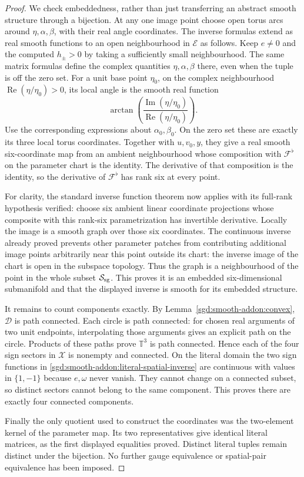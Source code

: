 \begin{proof}
We check embeddedness, rather than just transferring an abstract
smooth structure through a bijection.
At any one image point choose open torus arcs around
$\eta,\alpha,\beta$, with their real angle coordinates.
The inverse formulas extend as real smooth functions to an open
neighbourhood in $\mathcal E$ as follows. Keep $e\ne0$ and the
computed $h_\pm>0$ by taking a sufficiently small neighbourhood.
The same matrix formulas define the complex quantities
$\eta,\alpha,\beta$ there, even when the tuple is off the zero set.
For a unit base point $\eta_0$, on the complex neighbourhood
$\operatorname{Re}(\eta/\eta_0)>0$, its local angle is the smooth
real function
\[
 \arctan\!\left(
 \frac{\operatorname{Im}(\eta/\eta_0)}
      {\operatorname{Re}(\eta/\eta_0)}\right).
\]
Use the corresponding expressions about $\alpha_0,\beta_0$.
On the zero set these are exactly its three local torus coordinates.
Together with $u,v_0,y$, they give a real smooth six-coordinate
map from an ambient neighbourhood whose composition with
$\mathcal F^\flat$ on the parameter chart is the identity.
The derivative of that composition is the identity, so the
derivative of $\mathcal F^\flat$ has rank six at every point.

For clarity, the standard inverse function theorem now applies with
its full-rank hypothesis verified: choose six ambient linear
coordinate projections whose composite with this rank-six
parametrization has invertible derivative. Locally the image is a
smooth graph over those six coordinates.
The continuous inverse already proved prevents other parameter
patches from contributing additional image points arbitrarily near
this point outside its chart: the inverse image of the chart is
open in the subspace topology. Thus the graph is a neighbourhood
of the point in the whole subset $\mathcal S_{\rm sg}$.
This proves it is an embedded six-dimensional submanifold and that
the displayed inverse is smooth for its embedded structure.

It remains to count components exactly. By
Lemma~\ref{sgd:smooth-addon:convex}, $\mathcal D$ is path connected.
Each circle is path connected: for chosen real arguments of two
unit endpoints, interpolating those arguments gives an explicit
path on the circle. Products of these paths prove $\mathbb T^3$
is path connected. Hence each of the four sign sectors in
$\mathcal X$ is nonempty and connected.
On the literal domain the two sign functions in
\eqref{sgd:smooth-addon:literal-spatial-inverse} are continuous
with values in $\{1,-1\}$ because $e,\omega$ never vanish.
They cannot change on a connected subset, so distinct sectors
cannot belong to the same component. This proves there are
exactly four connected components.

Finally the only quotient used to construct the coordinates was
the two-element kernel of the parameter map.
Its two representatives give identical literal matrices, as the
first displayed equalities proved. Distinct literal tuples remain
distinct under the bijection. No further gauge equivalence or
spatial-pair equivalence has been imposed.
\end{proof}

